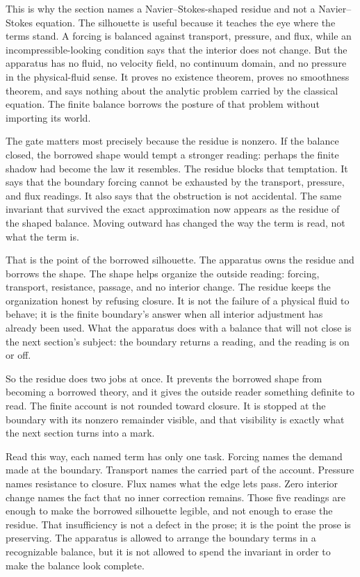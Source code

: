 This is why the section names a Navier--Stokes-shaped residue and not a Navier--Stokes equation.
The silhouette is useful because it teaches the eye where the terms stand. A forcing is balanced
against transport, pressure, and flux, while an incompressible-looking condition says that the
interior does not change. But the apparatus has no fluid, no velocity field, no continuum domain,
and no pressure in the physical-fluid sense. It proves no existence theorem, proves no smoothness
theorem, and says nothing about the analytic problem carried by the classical equation. The finite
balance borrows the posture of that problem without importing its world.

The gate matters most precisely because the residue is nonzero. If the balance closed, the borrowed
shape would tempt a stronger reading: perhaps the finite shadow had become the law it resembles.
The residue blocks that temptation. It says that the boundary forcing cannot be exhausted by the
transport, pressure, and flux readings. It also says that the obstruction is not accidental. The
same invariant that survived the exact approximation now appears as the residue of the shaped
balance. Moving outward has changed the way the term is read, not what the term is.

That is the point of the borrowed silhouette. The apparatus owns the residue and borrows the shape.
The shape helps organize the outside reading: forcing, transport, resistance, passage, and no
interior change. The residue keeps the organization honest by refusing closure. It is not the
failure of a physical fluid to behave; it is the finite boundary's answer when all interior
adjustment has already been used. What the apparatus does with a balance that will not close is the
next section's subject: the boundary returns a reading, and the reading is on or off.

So the residue does two jobs at once. It prevents the borrowed shape from becoming a borrowed
theory, and it gives the outside reader something definite to read. The finite account is not
rounded toward closure. It is stopped at the boundary with its nonzero remainder visible, and that
visibility is exactly what the next section turns into a mark.

Read this way, each named term has only one task. Forcing names the demand made at the boundary.
Transport names the carried part of the account. Pressure names resistance to closure. Flux names
what the edge lets pass. Zero interior change names the fact that no inner correction remains.
Those five readings are enough to make the borrowed silhouette legible, and not enough to erase
the residue. That insufficiency is not a defect in the prose; it is the point the prose is
preserving. The apparatus is allowed to arrange the boundary terms in a recognizable balance, but
it is not allowed to spend the invariant in order to make the balance look complete.

